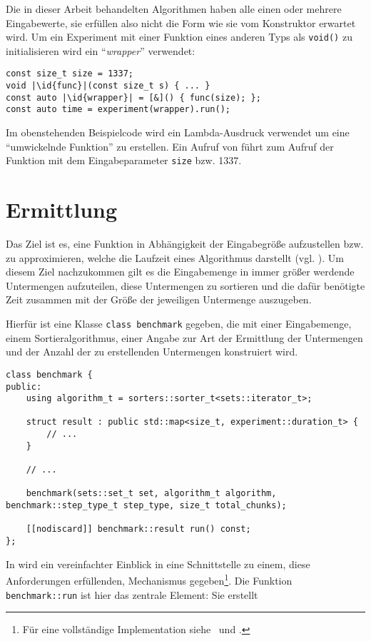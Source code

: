 Die in dieser Arbeit behandelten Algorithmen haben alle einen oder mehrere Eingabewerte, sie erfüllen also nicht die Form wie sie vom Konstruktor erwartet wird. Um ein Experiment mit einer Funktion eines anderen Typs als \lstinline{void()} zu initialisieren wird ein \enquote{\emph{wrapper}} verwendet:

\begin{lstlisting}[numbers=none]
const size_t size = 1337;
void |\id{func}|(const size_t s) { ... }
const auto |\id{wrapper}| = [&]() { func(size); };
const auto time = experiment(wrapper).run();
\end{lstlisting}

Im obenstehenden Beispielcode wird ein Lambda-Ausdruck verwendet um eine \enquote{umwickelnde Funktion}  zu erstellen. Ein Aufruf von  führt zum Aufruf der Funktion  mit dem Eingabeparameter \lstinline{size} bzw. 1337.

\section{Ermittlung}
\label{sec:funkterm}

Das Ziel ist es, eine Funktion in Abhängigkeit der Eingabegröße aufzustellen bzw. zu approximieren, welche die Laufzeit eines Algorithmus darstellt (vgl. \cite[37]{mcg2012}). Um diesem Ziel nachzukommen gilt es die Eingabemenge in immer größer werdende Untermengen aufzuteilen, diese Untermengen zu sortieren und die dafür benötigte Zeit zusammen mit der Größe der jeweiligen Untermenge auszugeben. 

Hierfür ist eine Klasse \lstinline{class benchmark} gegeben, die mit einer Eingabemenge, einem Sortieralgorithmus, einer Angabe zur Art der Ermittlung der Untermengen und der Anzahl der zu erstellenden Untermengen konstruiert wird.

\begin{lstlisting}[caption={Klasse zur Approximation einer Funktion der Laufzeit eines Algorithmus in Abhängigkeit der Eingabegröße.}, label=lst:simple-benchmark]
class benchmark {
public:
	using algorithm_t = sorters::sorter_t<sets::iterator_t>;

	struct result : public std::map<size_t, experiment::duration_t> {
	    // ...
	}

	// ...

	benchmark(sets::set_t set, algorithm_t algorithm, benchmark::step_type_t step_type, size_t total_chunks);

	[[nodiscard]] benchmark::result run() const;
};
\end{lstlisting}
\noindent
In  wird ein vereinfachter Einblick in eine Schnittstelle zu einem, diese Anforderungen erfüllenden, Mechanismus gegeben\footnote{Für eine vollständige Implementation siehe \crBenchmark~und \crBenchmarkImpl.}. Die Funktion \lstinline{benchmark::run} ist hier das zentrale Element: Sie erstellt

